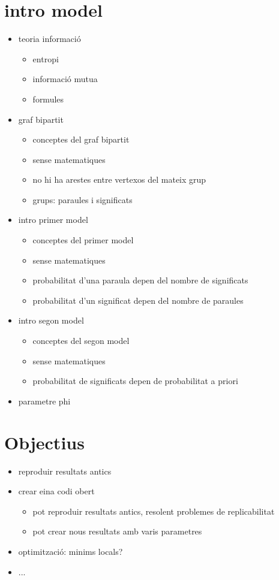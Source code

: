 \section{intro model}
\begin{itemize}
\item teoria informació
  \begin{itemize}
  \item entropi
  \item informació mutua
  \item formules
  \end{itemize}
\item graf bipartit
  \begin{itemize}
  \item conceptes del graf bipartit
  \item sense matematiques
  \item no hi ha arestes entre vertexos del mateix grup
  \item grups: paraules i significats
  \end{itemize}
\item intro primer model
  \begin{itemize}
  \item conceptes del primer model
  \item sense matematiques
  \item probabilitat d'una paraula depen del nombre de significats
  \item probabilitat d'un significat depen del nombre de paraules
  \end{itemize}
\item intro segon model
  \begin{itemize}
  \item conceptes del segon model
  \item sense matematiques
  \item probabilitat de significats depen de probabilitat a priori
  \end{itemize}
\item parametre phi
\end{itemize}
\section{Objectius}
\begin{itemize}
\item reproduir resultats antics
\item crear eina codi obert
  \begin{itemize}
  \item pot reproduir resultats antics, resolent problemes de replicabilitat
  \item pot crear nous resultats amb varis parametres
  \end{itemize}
\item optimització: minims locals?
\item ...
\end{itemize}
